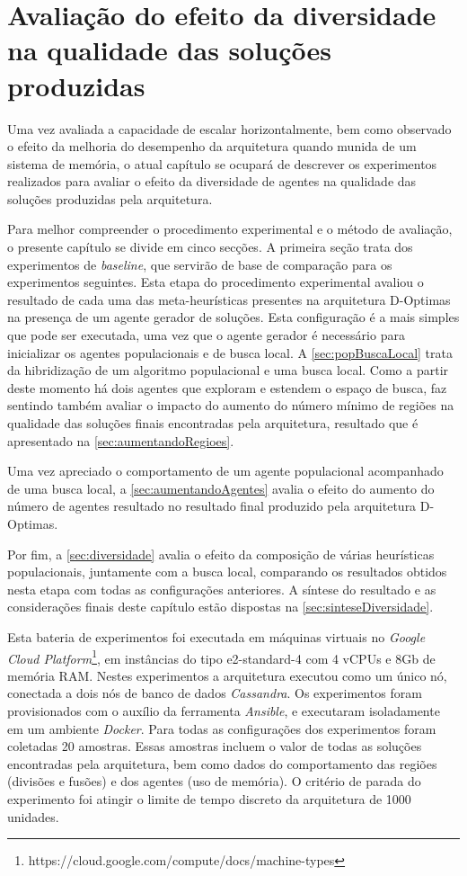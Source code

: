 \chapter{Avaliação do efeito da diversidade na qualidade das soluções produzidas}
\label{chap:exp_diversidade}

Uma vez avaliada a capacidade de escalar horizontalmente, bem como observado o efeito da melhoria do desempenho da arquitetura quando munida de um sistema de memória, o atual capítulo se ocupará de descrever os experimentos realizados para avaliar o efeito da diversidade de agentes na qualidade das soluções produzidas pela arquitetura.

Para melhor compreender o procedimento experimental e o método de avaliação, o presente capítulo se divide em cinco secções. A primeira seção trata dos experimentos de \textit{baseline}, que servirão de base de comparação para os experimentos seguintes. Esta etapa do procedimento experimental avaliou o resultado de cada uma das meta-heurísticas presentes na arquitetura D-Optimas na presença de um agente gerador de soluções. Esta configuração é a mais simples que pode ser executada, uma vez que o agente gerador é necessário para inicializar os agentes populacionais e de busca local. A \autoref{sec:popBuscaLocal} trata da hibridização de um algoritmo populacional e uma busca local. Como a partir deste momento há dois agentes que exploram e estendem o espaço de busca, faz sentindo também avaliar o impacto do aumento do número mínimo de regiões na qualidade das soluções finais encontradas pela arquitetura, resultado que é apresentado na \autoref{sec:aumentandoRegioes}. 

Uma vez apreciado o comportamento de um agente populacional acompanhado de uma busca local, a \autoref{sec:aumentandoAgentes} avalia o efeito do aumento do número de agentes resultado no resultado final produzido pela arquitetura D-Optimas. 

Por fim, a \autoref{sec:diversidade} avalia o efeito da composição de várias heurísticas populacionais, juntamente com a busca local, comparando os resultados obtidos nesta etapa com todas as configurações anteriores. A síntese do resultado e as considerações finais deste capítulo estão dispostas na \autoref{sec:sinteseDiversidade}.

Esta bateria de experimentos foi executada em máquinas virtuais no \textit{Google Cloud Platform}\footnote{https://cloud.google.com/compute/docs/machine-types}, em instâncias do tipo e2-standard-4 com 4 vCPUs e 8Gb de memória RAM. Nestes experimentos a arquitetura executou como um único nó, conectada a dois nós de banco de dados \textit{Cassandra}. Os experimentos foram provisionados com o auxílio da ferramenta \textit{Ansible}, e executaram isoladamente em um ambiente \textit{Docker}. Para todas as configurações dos experimentos foram coletadas 20 amostras. Essas amostras incluem o valor de todas as soluções encontradas pela arquitetura, bem como dados do comportamento das regiões (divisões e fusões) e dos agentes (uso de memória). O critério de parada do experimento foi atingir o limite de tempo discreto da arquitetura de 1000 unidades. 

